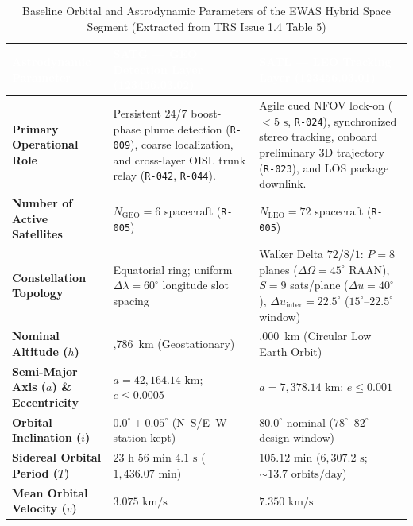 \documentclass[11pt,a4paper]{article}
\newcommand{\thead}[1]{\textcolor{white}{\textbf{\textsf{#1}}}}
\providecommand{\abbr}[1]{#1}
\begin{document}
\begin{table}[H]
\centering
\caption{Baseline Orbital and Astrodynamic Parameters of the EWAS Hybrid Space Segment (Extracted from TRS Issue 1.4 Table 5)}
\label{tab:sseg_orbital_params_archived}
{\footnotesize\setlength{\tabcolsep}{4pt}\renewcommand{\arraystretch}{1.12}%
%
%
\noindent
\begin{tabularx}{\textwidth}{|>{\raggedright\arraybackslash}p{3.6cm}|>{\raggedright\arraybackslash}X|>{\raggedright\arraybackslash}X|}
    \hline
    \rowcolor{TableHeaderBlue}
    \thead{Astrodynamic Parameter} & \thead{SATG --- GEO Detection Layer (123456.03.02)} & \thead{SATL --- LEO Tracking Layer (123456.03.01)} \\ \hline
    \textbf{Primary Operational Role} & Persistent 24/7 boost-phase plume detection (\texttt{R-009}), coarse localization, and cross-layer \abbr{OISL} trunk relay (\texttt{R-042}, \texttt{R-044}). & Agile cued \abbr{NFOV} lock-on ($< 5\text{ s}$, \texttt{R-024}), synchronized stereo tracking, onboard preliminary 3D trajectory (\texttt{R-023}), and \abbr{LOS} package downlink. \\ \hline
    \textbf{Number of Active Satellites} & $N_{\text{GEO}} = 6$ spacecraft (\texttt{R-005}) & $N_{\text{LEO}} = 72$ spacecraft (\texttt{R-005}) \\ \hline
    \textbf{Constellation Topology} & Equatorial ring; uniform $\Delta\lambda = 60^\circ$ longitude slot spacing & Walker Delta $72/8/1$: $P = 8$ planes ($\Delta\Omega = 45^\circ$ RAAN), $S = 9$ sats/plane ($\Delta u = 40^\circ$), $\Delta u_{\text{inter}} = 22.5^\circ$ (\mbox{$15^\circ\text{--}22.5^\circ$} window) \\ \hline
    \textbf{Nominal Altitude ($h$)} & 35,786~km (Geostationary) & 1,000~km (Circular Low Earth Orbit) \\ \hline
    \textbf{Semi-Major Axis ($a$) \& Eccentricity} & $a = 42{,}164.14\text{ km}$; $e \le 0.0005$ & $a = 7{,}378.14\text{ km}$; $e \le 0.001$ \\ \hline
    \textbf{Orbital Inclination ($i$)} & $0.0^\circ \pm 0.05^\circ$ (N--S/E--W station-kept) & $80.0^\circ$ nominal (\mbox{$78^\circ\text{--}82^\circ$} design window) \\ \hline
    \textbf{Sidereal Orbital Period ($T$)} & $23\text{ h }56\text{ min }4.1\text{ s}$ ($1{,}436.07\text{ min}$) & $105.12\text{ min}$ ($6{,}307.2\text{ s}$; $\sim 13.7\text{ orbits/day}$) \\ \hline
    \textbf{Mean Orbital Velocity ($v$)} & $3.075\text{ km/s}$ & $7.350\text{ km/s}$ \\ \hline

\end{tabularx}}
\end{table}
\end{document}
